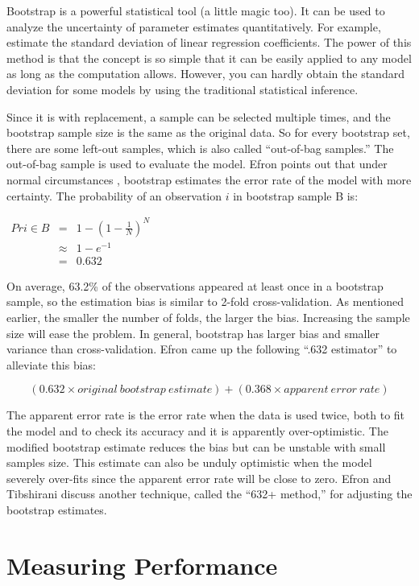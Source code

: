 \documentclass[
  12pt,
]{krantz}
\begin{document}
Bootstrap is a powerful statistical tool (a little magic too). It can be used to analyze the uncertainty of parameter estimates \citep{bootstrap1986} quantitatively. For example, estimate the standard deviation of linear regression coefficients. The power of this method is that the concept is so simple that it can be easily applied to any model as long as the computation allows. However, you can hardly obtain the standard deviation for some models by using the traditional statistical inference.

Since it is with replacement, a sample can be selected multiple times, and the bootstrap sample size is the same as the original data. So for every bootstrap set, there are some left-out samples, which is also called ``out-of-bag samples.'' The out-of-bag sample is used to evaluate the model. Efron points out that under normal circumstances \citep{efron1983}, bootstrap estimates the error rate of the model with more certainty. The probability of an observation \(i\) in bootstrap sample B is:

\(\begin{array}{ccc} Pr{i\in B} & = & 1-\left(1-\frac{1}{N}\right)^{N}\\  & \approx & 1-e^{-1}\\  & = & 0.632 \end{array}\)

On average, 63.2\% of the observations appeared at least once in a bootstrap sample, so the estimation bias is similar to 2-fold cross-validation. As mentioned earlier, the smaller the number of folds, the larger the bias. Increasing the sample size will ease the problem. In general, bootstrap has larger bias and smaller variance than cross-validation. Efron came up the following ``.632 estimator'' to alleviate this bias:

\[(0.632 × original\ bootstrap\ estimate) + (0.368 × apparent\ error\ rate)\]

The apparent error rate is the error rate when the data is used twice, both to fit the model and to check its accuracy and it is apparently over-optimistic. The modified bootstrap estimate reduces the bias but can be unstable with small samples size. This estimate can also be unduly optimistic when the model severely over-fits since the apparent error rate will be close to zero. Efron and Tibshirani \citep{b632plus} discuss another technique, called the ``632+ method,'' for adjusting the bootstrap estimates.

\hypertarget{measuring-performance}{%
\chapter{Measuring Performance}\label{measuring-performance}}
\end{document}
